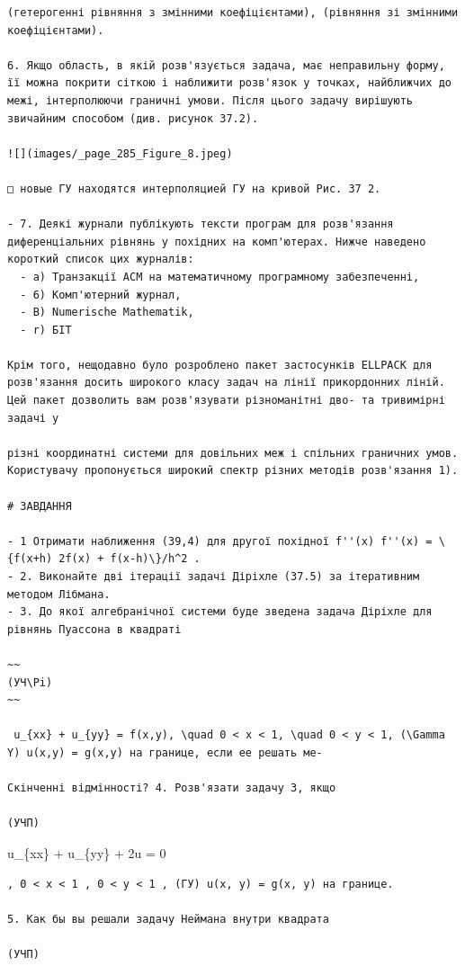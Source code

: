 \documentclass[
  ukrainian,
]{article}
\begin{document}
\begin{verbatim}
(гетерогенні рівняння з змінними коефіцієнтами), (рівняння зі змінними коефіцієнтами).

6. Якщо область, в якій розв'язується задача, має неправильну форму, її можна покрити сіткою і наближити розв'язок у точках, найближчих до межі, інтерполюючи граничні умови. Після цього задачу вирішують звичайним способом (див. рисунок 37.2).

![](images/_page_285_Figure_8.jpeg)

□ новые ГУ находятся интерполяцией ГУ на кривой Рис. 37 2.

- 7. Деякі журнали публікують тексти програм для розв'язання диференціальних рівнянь у похідних на комп'ютерах. Нижче наведено короткий список цих журналів:
  - a) Транзакції ACM на математичному програмному забезпеченні,
  - 6) Комп'ютерний журнал,
  - B) Numerische Mathematik,
  - r) БІТ

Крім того, нещодавно було розроблено пакет застосунків ELLPACK для розв'язання досить широкого класу задач на лінії прикордонних ліній. Цей пакет дозволить вам розв'язувати різноманітні дво- та тривимірні задачі у

різні координатні системи для довільних меж і спільних граничних умов. Користувачу пропонується широкий спектр різних методів розв'язання 1).

# ЗАВДАННЯ

- 1 Отримати наближення (39,4) для другої похідної f''(x) f''(x) = \{f(x+h) 2f(x) + f(x-h)\}/h^2 .
- 2. Виконайте дві ітерації задачі Діріхле (37.5) за ітеративним методом Лібмана.
- 3. До якої алгебранічної системи буде зведена задача Діріхле для рівнянь Пуассона в квадраті

~~
(УЧ\Pi)
~~

 u_{xx} + u_{yy} = f(x,y), \quad 0 < x < 1, \quad 0 < y < 1, (\Gamma Y) u(x,y) = g(x,y) на границе, если ее решать ме-

Скінченні відмінності? 4. Розв'язати задачу 3, якщо

(УЧП)
\end{verbatim}

u\_\{xx\} + u\_\{yy\} + 2u = 0

\begin{verbatim}
, 0 < x < 1 , 0 < y < 1 , (ГУ) u(x, y) = g(x, y) на границе.

5. Как бы вы решали задачу Неймана внутри квадрата

(УЧП)
\end{verbatim}
\end{document}
